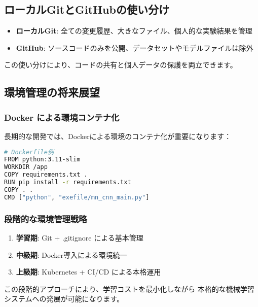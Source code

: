 \documentclass{ltjsarticle}      %
\begin{document}
\subsection{ローカルGitとGitHubの使い分け}
\begin{itemize}
    \item \textbf{ローカルGit}: 全ての変更履歴、大きなファイル、個人的な実験結果を管理
    \item \textbf{GitHub}: ソースコードのみを公開、データセットやモデルファイルは除外
\end{itemize}

この使い分けにより、コードの共有と個人データの保護を両立できます。

\subsection{環境管理の将来展望}

\subsubsection{Docker による環境コンテナ化}
長期的な開発では、Dockerによる環境のコンテナ化が重要になります：

\begin{lstlisting}[language=bash]
# Dockerfile例
FROM python:3.11-slim
WORKDIR /app
COPY requirements.txt .
RUN pip install -r requirements.txt
COPY . .
CMD ["python", "exefile/mn_cnn_main.py"]
\end{lstlisting}

\subsubsection{段階的な環境管理戦略}
\begin{enumerate}
    \item \textbf{学習期}: Git + .gitignore による基本管理
    \item \textbf{中級期}: Docker導入による環境統一
    \item \textbf{上級期}: Kubernetes + CI/CD による本格運用
\end{enumerate}

この段階的アプローチにより、学習コストを最小化しながら
本格的な機械学習システムへの発展が可能になります。
\end{document}
